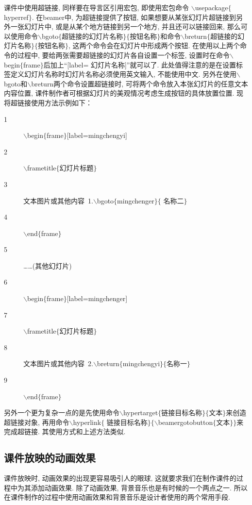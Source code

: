 课件中使用超链接, 同样要在导言区引用宏包, 即使用宏包命令
$\backslash$usepackage$\{$hyperref$\}$. 在beamer中, 为超链接提供了按钮, 如果想要从某张幻灯片超链接到另外一张幻灯片中, 或是从某个地方链接到另一个地方, 并且还可以链接回来, 那么可以使用命令$\backslash$bgoto$\{$超链接的幻灯片名称$\}\{$按钮名称$\}$和命令$\backslash$breturn$\{$超链接的幻灯片名称$\}\{$按钮名称$\}$, 这两个命令会在幻灯片中形成两个按钮. 在使用以上两个命令的过程中, 要给两张需要超链接的幻灯片各自设置一个标签, 设置时在命令$\backslash$begin$\{$frame$\}$后加上“[label= 幻灯片名称]”就可以了. 此处值得注意的是在设置标签定义幻灯片名称时幻灯片名称必须使用英文输入, 不能使用中文. 另外在使用$\backslash$bgoto和$\backslash$breturn两个命令设置超链接时, 可将两个命令放入本张幻灯片的任意文本内容位置, 课件制作者可根据幻灯片的美观情况考虑生成按钮的具体放置位置. 现将超链接使用方法示例如下：
\begin{description}
  \item[1]$\backslash$begin$\{$frame$\}$[label=mingchengyi]
  \item[2]$\backslash$frametitle$\{$幻灯片标题$\}$
  \item[3] 文本图片或其他内容~1.$\backslash$bgoto$\{$mingchenger$\}\{$ 名称二$\}$
  \item[4]$\backslash$end$\{$frame$\}$
  \item[5] \ldots\ldots(其他幻灯片)
  \item[6]$\backslash$begin$\{$frame$\}$[label=mingchenger]
  \item[7]$\backslash$frametitle$\{$幻灯片标题$\}$
  \item[8] 文本图片或其他内容~2.$\backslash$breturn$\{$mingchengyi$\}\{$名称一$\}$
  \item[9]$\backslash$end$\{$frame$\}$
   \end{description}


另外一个更为复杂一点的是先使用命令$\backslash$hypertarget$\{$链接目标名称$\}\{$文本$\}$来创造超链接对象, 再用命令$\backslash$hyperlink$\{$ 链接目标名称$\}\{\backslash$beamergotobutton$\{$文本$\}\}$来完成超链接. 其使用方式和上述方法类似.

\subsection{课件放映的动画效果}

课件放映时, 动画效果的出现更容易吸引人的眼球, 这就要求我们在制作课件的过程中为其添加动画效果. 除了动画效果, 背景音乐也是有时候的一个两点之一. 所以在课件制作的过程中使用动画效果和背景音乐是设计者使用的两个常用手段.


